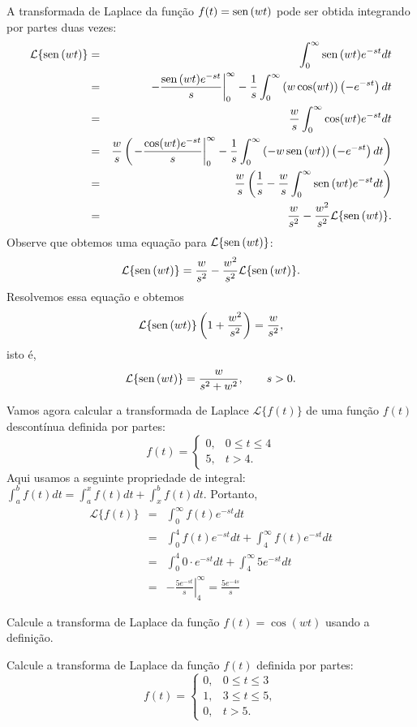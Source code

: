 \begin{ex}{\label{ex_trans_sin}}A transformada de Laplace da função $f(t)=\operatorname{sen}\,(w t)$ pode ser obtida integrando por partes duas vezes:
\begin{eqnarray*}
\mathcal{L}\{\operatorname{sen}\,(wt)\}&=&\int_0^\infty \operatorname{sen}\,(wt)e^{-st}dt\\
&=&\left.-\frac{\operatorname{sen}\,(wt)e^{-st}}{s}\right|_0^\infty-\frac{1}{s}\int_0^\infty \left(w\cos(wt)\right)\left(-e^{-st}\right)dt\\
&=&\frac{w}{s}\int_0^\infty \cos(wt)e^{-st}dt\\
&=&\frac{w}{s}\left(\left.-\frac{\cos(wt)e^{-st}}{s}\right|_0^\infty-\frac{1}{s}\int_0^\infty \left(-w\operatorname{sen}\,(wt)\right)\left(-e^{-st}\right)dt\right)\\
&=&\frac{w}{s}\left(\frac{1}{s}-\frac{w}{s}\int_0^\infty \operatorname{sen}\,(wt)e^{-st}dt\right)\\
&=&\frac{w}{s^2}-\frac{w^2}{s^2}\mathcal{L}\{\operatorname{sen}\,(wt)\} .
\end{eqnarray*}
Observe que obtemos uma equação para $\mathcal{L}\{\operatorname{sen}\,(wt)\}$:
$$
\mathcal{L}\{\operatorname{sen}\,(wt)\} =\frac{w}{s^2}-\frac{w^2}{s^2}\mathcal{L}\{\operatorname{sen}\,(wt)\} .
$$
Resolvemos essa equação e obtemos
$$
\mathcal{L}\{\operatorname{sen}\,(wt)\}\left(1+\frac{w^2}{s^2}\right)=\frac{w}{s^2},
$$
isto é,
$$
\mathcal{L}\{\operatorname{sen}\,(wt)\}=\frac{w}{s^2+w^2},\qquad s>0.
$$
\end{ex}
\begin{ex} Vamos agora calcular a transformada de Laplace $\mathcal{L}\{f(t)\}$ de uma função $f(t)$ descontínua definida por partes:
$$
f(t)=\left\{\begin{array}{ll} 0, &0\leq t\leq 4\\ 5, & t> 4.
\end{array}\right.
$$
Aqui usamos a seguinte propriedade de integral: $\int_a^b f(t)dt=\int_a^x f(t)dt+\int_x^b f(t)dt$. Portanto,
\begin{eqnarray*}
\mathcal{L}\{f(t)\}&=&\int_0^\infty f(t)e^{-st}dt\\
&=&\int_0^4 f(t)e^{-st}dt+\int_4^\infty f(t)e^{-st}dt\\
&=&\int_0^4 0\cdot e^{-st}dt+\int_4^\infty 5 e^{-st}dt\\
&=&\left.-\frac{5e^{-st}}{s}\right|_4^\infty=\frac{5e^{-4s}}{s}
\end{eqnarray*}
\end{ex}
\begin{exer}Calcule a transforma de Laplace da função $f(t)=\cos(wt)$ usando a definição. 
\end{exer}
\begin{exer}Calcule a transforma de Laplace da função $f(t)$ definida por partes:
$$
f(t)=\left\{\begin{array}{ll} 0, &0\leq t\leq 3\\ 1, & 3\leq t\leq 5,\\0,&t>5.
\end{array}\right.
$$
\end{exer}
